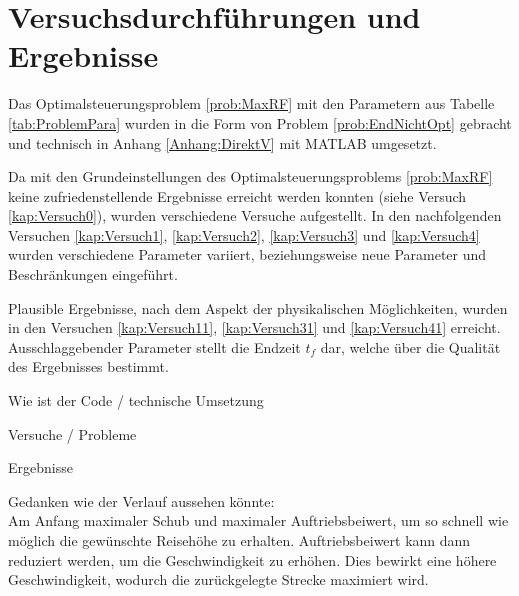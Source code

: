 \section{Versuchsdurchführungen und Ergebnisse}
Das Optimalsteuerungsproblem \ref{prob:MaxRF} mit den Parametern aus Tabelle \ref{tab:ProblemPara} wurden in die Form von Problem \ref{prob:EndNichtOpt} gebracht und technisch in Anhang \ref{Anhang:DirektV} mit MATLAB umgesetzt. 

Da mit den Grundeinstellungen des Optimalsteuerungsproblems \ref{prob:MaxRF} keine zufriedenstellende Ergebnisse erreicht werden konnten (siehe Versuch \ref{kap:Versuch0}), wurden verschiedene Versuche aufgestellt. In den nachfolgenden Versuchen \ref{kap:Versuch1}, \ref{kap:Versuch2}, \ref{kap:Versuch3} und \ref{kap:Versuch4} wurden verschiedene Parameter variiert, beziehungsweise neue Parameter und Beschränkungen eingeführt.

Plausible Ergebnisse, nach dem Aspekt der physikalischen Möglichkeiten, wurden in den Versuchen \ref{kap:Versuch11}, \ref{kap:Versuch31} und  \ref{kap:Versuch41} erreicht. Ausschlaggebender Parameter stellt die Endzeit $t_f$ dar, welche über die Qualität des Ergebnisses bestimmt.

Wie ist der Code / technische Umsetzung 

Versuche / Probleme 

Ergebnisse


Gedanken wie der Verlauf aussehen könnte:\\
Am Anfang maximaler Schub und maximaler Auftriebsbeiwert, um so schnell wie möglich die gewünschte Reisehöhe zu erhalten. Auftriebsbeiwert kann dann reduziert werden, um die Geschwindigkeit zu erhöhen. Dies bewirkt eine höhere Geschwindigkeit, wodurch die zurückgelegte Strecke maximiert wird.


 








